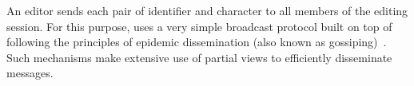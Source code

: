 
%   


An editor sends each pair of identifier and character to all members of the
editing session. For this purpose, \CRATE uses a very simple broadcast protocol
built on top of \SPRAY following the principles of epidemic dissemination (also
known as gossiping)~\cite{demers1987epidemic}. Such mechanisms make extensive
use of partial views to efficiently disseminate messages.

